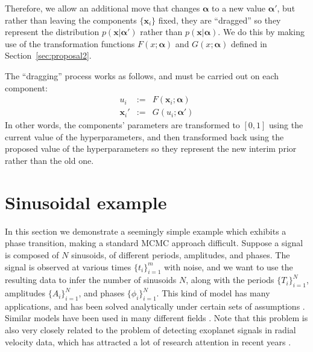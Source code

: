 \documentclass[letterpaper, 11pt]{article}
\newcommand{\hyperparams}{\boldsymbol{\alpha}}
\newcommand{\xx}{\mathbf{x}}
\begin{document}
Therefore, we allow an additional move that changes $\hyperparams$ to a new
value $\hyperparams'$, but rather than leaving the components $\{\xx_i\}$ fixed,
they are ``dragged''
so they represent the distribution $p(\xx | \hyperparams')$ rather than
$p(\xx|\hyperparams)$. We do this by making use of the transformation functions
$F(x; \hyperparams)$ and $G(x; \hyperparams)$ defined in
Section~\ref{sec:proposal2}.

The ``dragging'' process works as follows, and must be carried out on
each component:
\begin{eqnarray}
u_i &:=& F(\xx_i; \hyperparams)\\
\xx_i' &:=& G(u_i; \hyperparams')
\end{eqnarray}
In other words, the components' parameters are transformed to $[0,1]$ using the
current value of the hyperparameters, and then transformed back using the
proposed value of the hyperparameters so they represent the new interim prior
rather than the old one.

\section{Sinusoidal example}\label{sec:sinewaves}
In this section we demonstrate a seemingly simple example which exhibits
a phase transition, making a standard MCMC approach difficult. Suppose
a signal is composed of $N$ sinusoids, of different periods, amplitudes,
and phases. The signal is observed at various times $\{t_i\}_{i=1}^m$ with
noise, and we want to use the resulting data to infer the number of sinusoids
$N$, along with the periods $\{T_i\}_{i=1}^N$, amplitudes $\{A_i\}_{i=1}^N$,
and phases $\{\phi_i\}_{i=1}^N$.
This kind of model has many applications, and has been solved analytically
under certain sets of assumptions \citep[see e.g.][]{bretthorst, 2014arXiv1412.0467M}.
Similar
models have been used in many different fields
\citep[e.g.][]{2003AIPC..659....3B, 2005PhRvD..72b2001U, 2007ApJ...654..551B,
2009MNRAS.395.2226B}.
Note that this problem is also very closely related to the
problem of detecting exoplanet signals in radial velocity data, which has
attracted a lot of research attention in recent years
\citep[e.g.][]{gregory, fengji, 2011MNRAS.415.3462F}.
\end{document}
